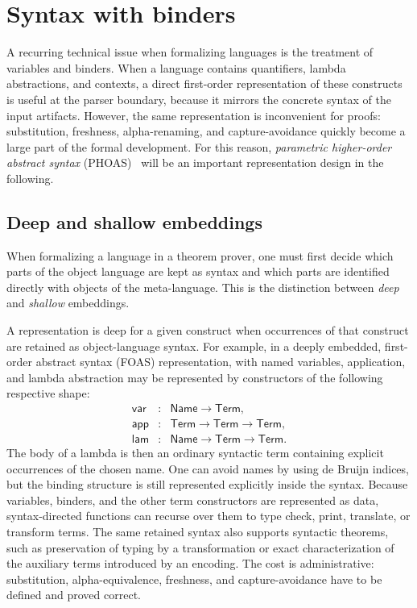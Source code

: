 \section{Syntax with binders}
\label{sec:phoas}

A recurring technical issue when formalizing languages is the treatment of variables and binders.
When a language contains quantifiers, lambda abstractions, and contexts, a direct
first-order representation of these constructs is useful at the parser boundary, because it mirrors
the concrete syntax of the input artifacts.
However, the same representation is inconvenient for proofs: substitution, freshness, alpha-renaming,
and capture-avoidance quickly become a large part of the formal development.
For this reason, \emph{parametric higher-order abstract syntax} (PHOAS)~\cite{chlipala2008phoas} will be an important
representation design in the following.

\subsection{Deep and shallow embeddings}

When formalizing a language in a theorem prover, one must first decide which parts of the object language are kept as syntax and which parts are identified directly with objects of the meta-language.
This is the distinction between \emph{deep} and \emph{shallow} embeddings.

A representation is deep for a given construct when occurrences of that construct are retained as object-language syntax.
For example, in a deeply embedded, first-order abstract syntax (FOAS) representation, with named variables, application, and lambda abstraction may be represented by constructors of the following respective shape:
\[
\begin{array}{rcl}
  \mathsf{var} &:& \mathsf{Name} \to \mathsf{Term},\\
  \mathsf{app} &:& \mathsf{Term} \to \mathsf{Term} \to \mathsf{Term},\\
  \mathsf{lam} &:& \mathsf{Name} \to \mathsf{Term} \to \mathsf{Term}.
\end{array}
\]
The body of a lambda is then an ordinary syntactic term containing explicit occurrences of the chosen name.
One can avoid names by using de Bruijn indices, but the binding structure is still represented explicitly inside the syntax.
Because variables, binders, and the other term constructors are represented as data, syntax-directed functions can recurse over them to type check, print, translate, or transform terms.
The same retained syntax also supports syntactic theorems, such as preservation of typing by a transformation or exact characterization of the auxiliary terms introduced by an encoding.
The cost is administrative: substitution, alpha-equivalence, freshness, and capture-avoidance have to be defined and proved correct.

